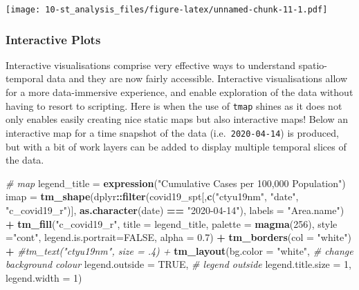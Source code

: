 \documentclass[
]{book}
\newenvironment{Shaded}{\begin{snugshade}}{\end{snugshade}}
\newcommand{\CommentTok}[1]{\textcolor[rgb]{0.56,0.35,0.01}{\textit{#1}}}
\newcommand{\DataTypeTok}[1]{\textcolor[rgb]{0.13,0.29,0.53}{#1}}
\newcommand{\DecValTok}[1]{\textcolor[rgb]{0.00,0.00,0.81}{#1}}
\newcommand{\FloatTok}[1]{\textcolor[rgb]{0.00,0.00,0.81}{#1}}
\newcommand{\KeywordTok}[1]{\textcolor[rgb]{0.13,0.29,0.53}{\textbf{#1}}}
\newcommand{\NormalTok}[1]{#1}
\newcommand{\OperatorTok}[1]{\textcolor[rgb]{0.81,0.36,0.00}{\textbf{#1}}}
\newcommand{\OtherTok}[1]{\textcolor[rgb]{0.56,0.35,0.01}{#1}}
\newcommand{\StringTok}[1]{\textcolor[rgb]{0.31,0.60,0.02}{#1}}
\begin{document}
\texttt{[image: 10-st\_analysis\_files/figure-latex/unnamed-chunk-11-1.pdf]}

\hypertarget{interactive-plots}{%
\subsubsection{Interactive Plots}\label{interactive-plots}}

Interactive visualisations comprise very effective ways to understand spatio-temporal data and they are now fairly accessible. Interactive visualisations allow for a more data-immersive experience, and enable exploration of the data without having to resort to scripting. Here is when the use of \texttt{tmap} shines as it does not only enables easily creating nice static maps but also interactive maps! Below an interactive map for a time snapshot of the data (i.e.~\texttt{2020-04-14}) is produced, but with a bit of work layers can be added to display multiple temporal slices of the data.

\begin{Shaded}
\begin{Highlighting}[]
\CommentTok{# map}
\NormalTok{legend_title =}\StringTok{ }\KeywordTok{expression}\NormalTok{(}\StringTok{"Cumulative Cases per 100,000 Population"}\NormalTok{)}
\NormalTok{imap =}\StringTok{ }\KeywordTok{tm_shape}\NormalTok{(dplyr}\OperatorTok{::}\KeywordTok{filter}\NormalTok{(covid19_spt[,}\KeywordTok{c}\NormalTok{(}\StringTok{"ctyu19nm"}\NormalTok{, }\StringTok{"date"}\NormalTok{, }\StringTok{"c_covid19_r"}\NormalTok{)], }\KeywordTok{as.character}\NormalTok{(date) }\OperatorTok{==}\StringTok{ "2020-04-14"}\NormalTok{), }\DataTypeTok{labels =} \StringTok{"Area.name"}\NormalTok{) }\OperatorTok{+}
\StringTok{  }\KeywordTok{tm_fill}\NormalTok{(}\StringTok{"c_covid19_r"}\NormalTok{, }\DataTypeTok{title =}\NormalTok{ legend_title, }\DataTypeTok{palette =} \KeywordTok{magma}\NormalTok{(}\DecValTok{256}\NormalTok{), }\DataTypeTok{style =}\StringTok{"cont"}\NormalTok{, }\DataTypeTok{legend.is.portrait=}\OtherTok{FALSE}\NormalTok{, }\DataTypeTok{alpha =} \FloatTok{0.7}\NormalTok{) }\OperatorTok{+}
\StringTok{  }\KeywordTok{tm_borders}\NormalTok{(}\DataTypeTok{col =} \StringTok{"white"}\NormalTok{) }\OperatorTok{+}
\StringTok{  }\CommentTok{#tm_text("ctyu19nm", size = .4) +}
\StringTok{  }\KeywordTok{tm_layout}\NormalTok{(}\DataTypeTok{bg.color =} \StringTok{"white"}\NormalTok{, }\CommentTok{# change background colour}
            \DataTypeTok{legend.outside =} \OtherTok{TRUE}\NormalTok{, }\CommentTok{# legend outside}
            \DataTypeTok{legend.title.size =} \DecValTok{1}\NormalTok{,}
            \DataTypeTok{legend.width =} \DecValTok{1}\NormalTok{) }
\end{Highlighting}
\end{Shaded}
\end{document}
